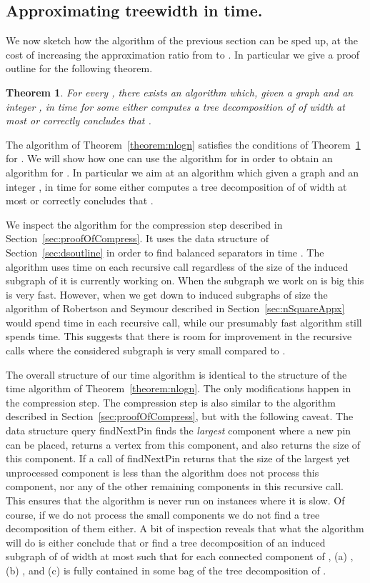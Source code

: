 \documentclass[a4paper,11pt]{article}
\newtheorem{theorem}{Theorem}
\theoremstyle{definition}
\theoremstyle{remark}
\newcommand{\qpin}{\textnormal{findNextPin}}
\begin{document}
\subsection{Approximating treewidth in 
  time.}
We now sketch how the algorithm of the previous section can be sped
up, at the cost of increasing the approximation ratio from  to .
In particular we give a proof outline for the following theorem.
\begin{theorem}\label{theorem:nlogin}
  For every , there exists an algorithm which,
  given a graph  and an integer , in  time for some  either computes a
  tree decomposition of  of width at most  or correctly
  concludes that .
\end{theorem}
The algorithm of Theorem~\ref{theorem:nlogn} satisfies the conditions
of Theorem~\ref{theorem:nlogin} for .  We will show how
one can use the algorithm for  in order to obtain an
algorithm for .  In particular we aim at an algorithm
which given a graph  and an integer , in  time for some  either computes a tree
decomposition of  of width at most  or correctly concludes
that .

We inspect the  algorithm for the compression step
described in Section~\ref{sec:proofOfCompress}.  It uses the data
structure of Section~\ref{sec:dsoutline} in order to find balanced
separators in time .  The algorithm uses  time on each recursive call regardless of the size of the induced
subgraph of  it is currently working on.  When the subgraph we work
on is big this is very fast.  However, when we get down to induced
subgraphs of size  the algorithm of Robertson and
Seymour described in Section~\ref{sec:nSquareAppx} would spend  time in each recursive call, while our presumably
fast algorithm still spends  time.  This suggests that
there is room for improvement in the recursive calls where the
considered subgraph is very small compared to .

The overall structure of our  time algorithm is
identical to the structure of the  time algorithm of
Theorem~\ref{theorem:nlogn}.  The only modifications happen in the
compression step.  The compression step is also similar to the  algorithm described in Section~\ref{sec:proofOfCompress}, but
with the following caveat.  The data structure query \qpin{} finds the
{\em largest} component where a new pin can be placed, returns a
vertex from this component, and also returns the size of this
component.  If a call of \qpin{} returns that the size of the largest
yet unprocessed component is less than  the algorithm does not
process this component, nor any of the other remaining components in
this recursive call.  This ensures that the algorithm is never run on
instances where it is slow.  Of course, if we do not process the small
components we do not find a tree decomposition of them either.  A bit
of inspection reveals that what the algorithm will do is either
conclude that  or find a tree decomposition of an induced
subgraph of  of width at most  such that for each connected
component  of , (a) , (b)
, and (c)  is fully contained in some bag
of the tree decomposition of .
\end{document}
